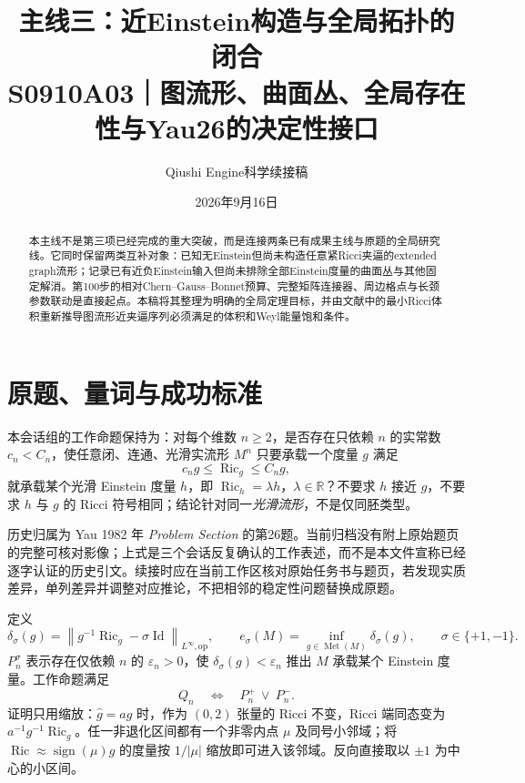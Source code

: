 \documentclass[UTF8,a4paper,11pt,fontset=fandol]{ctexart}
\title{主线三：近Einstein构造与全局拓扑的闭合\\[0.5em]{\large S0910A03｜图流形、曲面丛、全局存在性与Yau26的决定性接口}}
\author{Qiushi Engine\quad 科学续接稿}
\date{2026年9月16日}
\numberwithin{equation}{section}
\theoremstyle{definition}
\newcommand{\Ric}{\operatorname{Ric}}
\newcommand{\Met}{\operatorname{Met}}
\newcommand{\Id}{\operatorname{Id}}
\newcommand{\op}{\mathrm{op}}
\newcommand{\R}{\mathbb R}
\newcommand{\norm}[1]{\left\lVert#1\right\rVert}
\begin{document}
\maketitle
\begin{abstract}
本主线不是第三项已经完成的重大突破，而是连接两条已有成果主线与原题的全局研究线。它同时保留两类互补对象：已知无Einstein但尚未构造任意紧Ricci夹逼的extended graph流形；记录已有近负Einstein输入但尚未排除全部Einstein度量的曲面丛与其他固定解消。第100步的相对Chern--Gauss--Bonnet预算、完整矩阵连接器、周边格点与长颈参数联动是直接起点。本稿将其整理为明确的全局定理目标，并由文献中的最小Ricci体积重新推导图流形近夹逼序列必须满足的体积和Weyl能量饱和条件。
\end{abstract}
\begingroup
\small\linespread{1.0}\selectfont\setlength{\parskip}{0pt}
\tableofcontents
\endgroup
\clearpage

\section{原题、量词与成功标准}
本会话组的工作命题保持为：对每个维数 $n\ge2$，是否存在只依赖 $n$ 的实常数 $c_n<C_n$，使任意闭、连通、光滑实流形 $M^n$ 只要承载一个度量 $g$ 满足
\begin{equation}\label{eq:Q}
 c_ng\le\Ric_g\le C_ng,
\end{equation}
就承载某个光滑 Einstein 度量 $h$，即 $\Ric_h=\lambda h$，$\lambda\in\R$？不要求 $h$ 接近 $g$，不要求 $h$ 与 $g$ 的 Ricci 符号相同；结论针对同一\emph{光滑流形}，不是仅同胚类型。

历史归属为 Yau 1982 年 \emph{Problem Section} 的第26题\cite{Yau1982}。当前归档没有附上原始题页的完整可核对影像；上式是三个会话反复确认的工作表述，而不是本文件宣称已经逐字认证的历史引文。续接时应在当前工作区核对原始任务书与题页，若发现实质差异，单列差异并调整对应推论，不把相邻的稳定性问题替换成原题。

定义
\begin{equation}\label{eq:defect}
 \delta_\sigma(g)=\norm{g^{-1}\Ric_g-\sigma\Id}_{L^\infty,\op},\qquad
 e_\sigma(M)=\inf_{g\in\Met(M)}\delta_\sigma(g),\qquad \sigma\in\{+1,-1\}.
\end{equation}
$P_n^\sigma$ 表示存在仅依赖 $n$ 的 $\varepsilon_n>0$，使 $\delta_\sigma(g)<\varepsilon_n$ 推出 $M$ 承载某个 Einstein 度量。工作命题满足
\begin{equation}\label{eq:branches}
 Q_n\quad\Longleftrightarrow\quad P_n^+\ \lor\ P_n^-.
\end{equation}
证明只用缩放：$\widehat g=ag$ 时，作为 $(0,2)$ 张量的 Ricci 不变，Ricci 端同态变为 $a^{-1}g^{-1}\Ric_g$。任一非退化区间都有一个非零内点 $\mu$ 及同号小邻域；将 $\Ric\approx\operatorname{sign}(\mu)g$ 的度量按 $1/|\mu|$ 缩放即可进入该邻域。反向直接取以 $\pm1$ 为中心的小区间。
\end{document}
